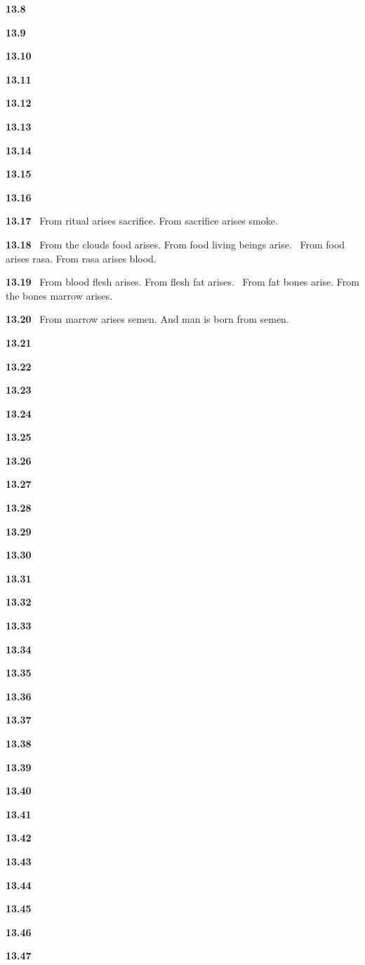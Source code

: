 \documentclass{article}
\begin{document}
\textbf{13.8}%


\textbf{13.9}%


\textbf{13.10}%


\textbf{13.11}%


\textbf{13.12}%


\textbf{13.13}%


\textbf{13.14}%


\textbf{13.15}%


\textbf{13.16}%


\textbf{13.17}%
\ From ritual arises sacrifice. From sacrifice arises smoke.%


\textbf{13.18}%
\ From the clouds food arises. From food living beings arise.%
\ From food arises rasa. From rasa arises blood.%


\textbf{13.19}%
\ From blood flesh arises. From flesh fat arises.%
\ From fat bones arise. From the bones marrow arises.%


\textbf{13.20}%
\ From marrow arises semen. And man is born from semen.%


\textbf{13.21}%


\textbf{13.22}%


\textbf{13.23}%


\textbf{13.24}%


\textbf{13.25}%


\textbf{13.26}%


\textbf{13.27}%


\textbf{13.28}%


\textbf{13.29}%


\textbf{13.30}%


\textbf{13.31}%


\textbf{13.32}%


\textbf{13.33}%


\textbf{13.34}%


\textbf{13.35}%


\textbf{13.36}%


\textbf{13.37}%


\textbf{13.38}%


\textbf{13.39}%


\textbf{13.40}%


\textbf{13.41}%


\textbf{13.42}%


\textbf{13.43}%


\textbf{13.44}%


\textbf{13.45}%


\textbf{13.46}%


\textbf{13.47}%
\end{document}

